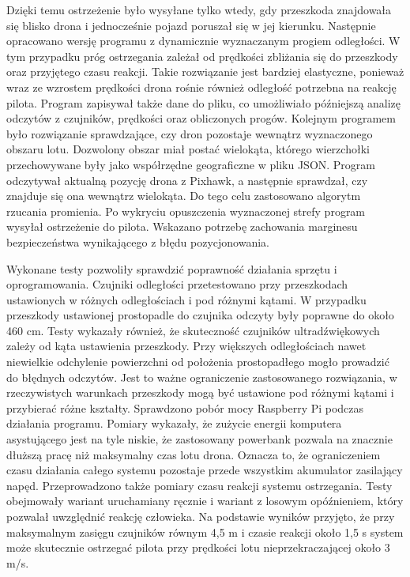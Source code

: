 \documentclass[a4paper,12pt]{book}
\begin{document}
    Dzięki temu ostrzeżenie było wysyłane tylko wtedy, gdy przeszkoda znajdowała się blisko drona i jednocześnie pojazd poruszał się w jej kierunku.
    Następnie opracowano wersję programu z dynamicznie wyznaczanym progiem odległości. W tym przypadku próg ostrzegania zależał od prędkości zbliżania się do przeszkody 
    oraz przyjętego czasu reakcji. Takie rozwiązanie jest bardziej elastyczne, ponieważ wraz ze wzrostem prędkości drona rośnie również odległość potrzebna na reakcję pilota. 
    Program zapisywał także dane do pliku, co umożliwiało późniejszą analizę odczytów z czujników, prędkości oraz obliczonych progów.
    Kolejnym programem było rozwiązanie sprawdzające, czy dron pozostaje wewnątrz wyznaczonego obszaru lotu. Dozwolony obszar miał postać wielokąta, którego wierzchołki przechowywane były 
    jako współrzędne geograficzne w pliku JSON. Program odczytywał aktualną pozycję drona z Pixhawk, a następnie sprawdzał, czy znajduje się ona wewnątrz wielokąta. Do tego celu 
    zastosowano algorytm rzucania promienia. Po wykryciu opuszczenia wyznaczonej strefy program wysyłał ostrzeżenie do pilota. Wskazano potrzebę zachowania marginesu bezpieczeństwa 
    wynikającego z błędu pozycjonowania.\par
    Wykonane testy pozwoliły sprawdzić poprawność działania sprzętu i oprogramowania. Czujniki odległości przetestowano przy przeszkodach ustawionych w różnych odległościach i pod 
    różnymi kątami. W przypadku przeszkody ustawionej prostopadle do czujnika odczyty były poprawne do około 460 cm. Testy wykazały również, że skuteczność czujników ultradźwiękowych 
    zależy od kąta ustawienia przeszkody. Przy większych odległościach nawet niewielkie odchylenie powierzchni od położenia prostopadłego mogło prowadzić do błędnych odczytów. 
    Jest to ważne ograniczenie zastosowanego rozwiązania, w rzeczywistych warunkach przeszkody mogą być ustawione pod różnymi kątami i przybierać różne kształty.
    Sprawdzono pobór mocy Raspberry Pi podczas działania programu. Pomiary wykazały, że zużycie energii komputera asystującego jest na tyle niskie, że zastosowany powerbank pozwala na 
    znacznie dłuższą pracę niż maksymalny czas lotu drona. Oznacza to, że ograniczeniem czasu działania całego systemu pozostaje przede wszystkim akumulator zasilający napęd. Przeprowadzono 
    także pomiary czasu reakcji systemu ostrzegania. Testy obejmowały wariant uruchamiany ręcznie i wariant z losowym opóźnieniem, który pozwalał uwzględnić reakcję człowieka. Na podstawie wyników 
    przyjęto, że przy maksymalnym zasięgu czujników równym 4,5 m i czasie reakcji około 1,5 s system może skutecznie ostrzegać pilota przy prędkości lotu nieprzekraczającej około 3 m/s.
\end{document}
